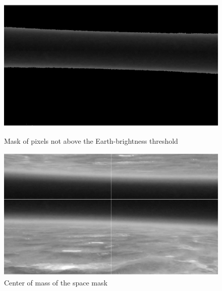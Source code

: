 \documentclass[10pt]{article}
\begin{document}
\begin{figure}[h]
        \begin{minipage}{.45\textwidth}
            \centering
                \includegraphics[width=\linewidth]{plots_tables_images/spacemask.eps}
                \caption{Mask of pixels not above the Earth-brightness threshold}
        \end{minipage}
        \hspace{.5in}
        \begin{minipage}{.45\textwidth}
            \centering
                \includegraphics[width=\linewidth]{plots_tables_images/maskcenter.eps}
                \caption{Center of mass of the space mask}
        \end{minipage}
    \end{figure}
\end{document}
